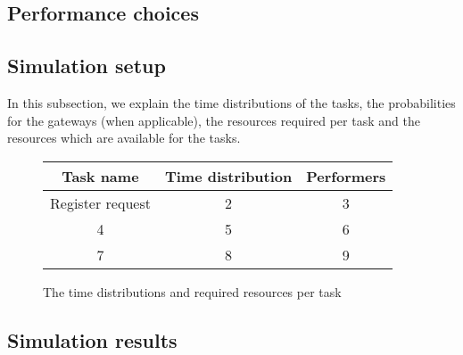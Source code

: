 
\subsection{Performance choices}

\subsection{Simulation setup}
In this subsection, we explain the time distributions of the tasks, the probabilities for the gateways (when applicable), the resources required per task and the resources which are available for the tasks.

\begin{figure}[h!]
	\centering
	\begin{tabular}{ | c | c | c | }
		\hline
		\textbf{Task name} & \textbf{Time distribution} & \textbf{Performers}\\ \hline\hline
		Register request & 2 & 3 \\ \hline
		4 & 5 & 6 \\ \hline
		7 & 8 & 9 \\
		\hline
	\end{tabular}
	\caption{The time distributions and required resources per task}
	\label{fig:tasktimes}
\end{figure}


\subsection{Simulation results}